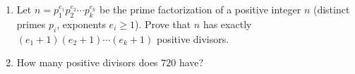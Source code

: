 \begin{enumerate}
\item[(a)] Let $n=p_1^{e_1}p_2^{e_2}\cdots p_k^{e_k}$ be the prime factorization of a positive integer $n$ (distinct primes $p_i$, exponents $e_i\ge1$). Prove that $n$ has exactly $(e_1+1)(e_2+1)\cdots(e_k+1)$ positive divisors.
\item[(b)] How many positive divisors does $720$ have?
\end{enumerate}

